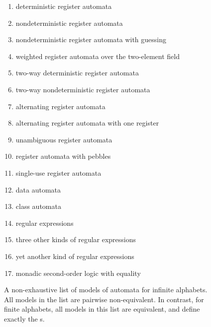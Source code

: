 \begin{figure}
    \begin{enumerate}
    \item deterministic register automata~\cite[Definition 3]{kaminskiFiniteMemoryAutomata1994}
    \item nondeterministic register automata~\cite[Definition 1]{kaminskiFiniteMemoryAutomata1994}
    \item nondeterministic register automata with guessing~\cite[Definition 2.7]{bojanczyk_slightly}
    \item weighted register automata over the two-element field~\cite[Definition 3.1]{orbitFiniteVectorTheoretics}
    \item two-way deterministic register automata~\cite[Definition 5]{kaminskiFiniteMemoryAutomata1994}
    \item two-way nondeterministic register automata~\cite[Definition 2.1]{nevenFiniteStateMachines2004}
    \item alternating register automata~\cite[p.~16:8]{lazicDemri09}
    \item alternating register automata with one register~\cite[p.~16:19]{lazicDemri09}
    \item unambiguous register automata~\cite[Section 5]{colcombet2015unambiguity}
    \item register automata with pebbles~\cite[Section 2.2]{nevenFiniteStateMachines2004}
    \item \label{it:single-use} single-use register automata~\cite[Definition 2]{bojanczykstefanski2020}
    \item data automata~\cite[Section 4.2]{bojanczykTwovariableLogicData2011}
    \item class automata~\cite[Section III]{bojanczykExtensionDataAutomata2010} 
    \item regular expressions~\cite[Definition 2]{regexpKaminskiTan2004}
    \item three other kinds of regular expressions~\cite[Sections 4, 5, 6]{regexpLibkin2015}
    \item yet another kind of regular expressions~\cite[Section 5]{KleeneNominal2019}
    \item monadic second-order logic with equality~\cite[Section 2.4]{nevenFiniteStateMachines2004}
\end{enumerate}
    \caption{A non-exhaustive list of models of automata for infinite alphabets. All models in the list are pairwise non-equivalent. In contrast, for finite alphabets, all models in this list are equivalent, and define exactly the s. }
    \label{fig:automata-infinite-alphabets}
\end{figure}




